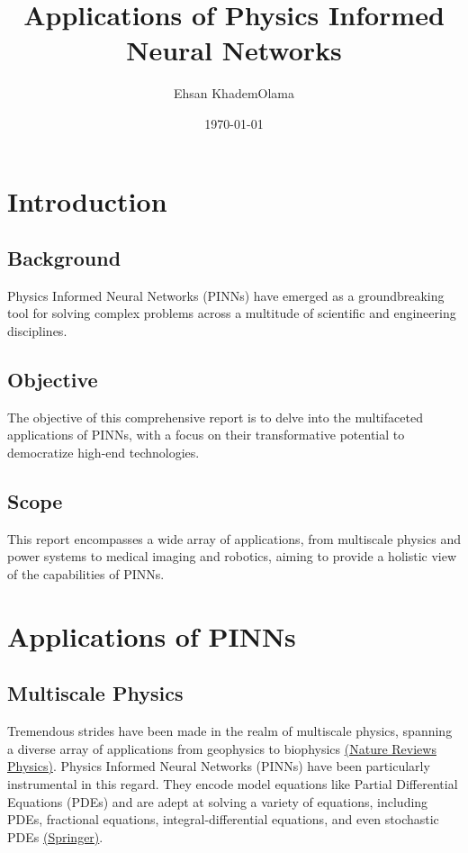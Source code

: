 \documentclass[12pt]{article}
\title{Applications of Physics Informed Neural Networks}
\author{Ehsan KhademOlama}
\date{\today}
\begin{document}
	
	\maketitle
	\tableofcontents
	
	\section{Introduction}
	\subsection{Background}
	Physics Informed Neural Networks (PINNs) have emerged as a groundbreaking tool for solving complex problems across a multitude of scientific and engineering disciplines.
	
	\subsection{Objective}
	The objective of this comprehensive report is to delve into the multifaceted applications of PINNs, with a focus on their transformative potential to democratize high-end technologies.
	
	\subsection{Scope}
	This report encompasses a wide array of applications, from multiscale physics and power systems to medical imaging and robotics, aiming to provide a holistic view of the capabilities of PINNs.
	
	\section{Applications of PINNs}
	\subsection{Multiscale Physics}
	Tremendous strides have been made in the realm of multiscale physics, spanning a diverse array of applications from geophysics to biophysics \href{https://www.nature.com/articles/s42254-021-00314-5}{(Nature Reviews Physics)}. Physics Informed Neural Networks (PINNs) have been particularly instrumental in this regard. They encode model equations like Partial Differential Equations (PDEs) and are adept at solving a variety of equations, including PDEs, fractional equations, integral-differential equations, and even stochastic PDEs \href{https://link.springer.com/article/10.1007/s10915-022-01939-z}{(Springer)}. 
	
\end{document}
